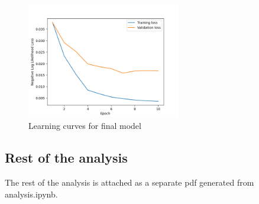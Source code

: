 \begin{figure}[H]
\caption{Learning curves for final model}
\centering
\includegraphics[width=0.6\textwidth]{plots/best_model_curves.png}
\end{figure}

\subsection{Rest of the analysis}
The rest of the analysis is attached as a separate pdf generated from
analysis.ipynb.



